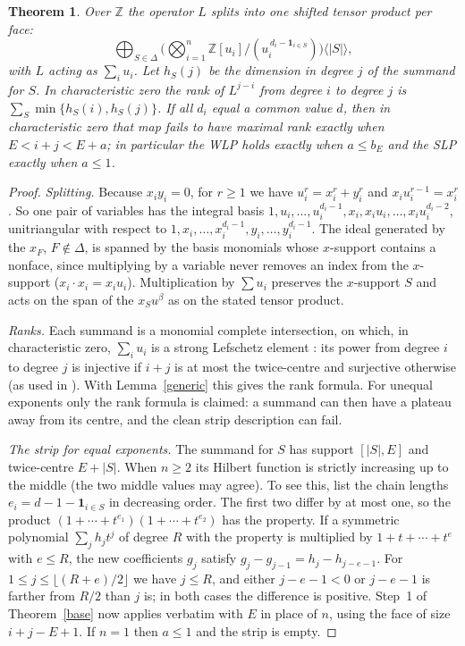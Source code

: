 \documentclass[11pt,a4paper]{article}
\newtheorem{theorem}{Theorem}[section]
\theoremstyle{definition}
\begin{document}
\begin{theorem}\label{higher}
Over $\mathbb Z$ the operator $L$ splits into one shifted tensor product per face:
\[
 \bigoplus_{S\in\Delta}\Big(\bigotimes_{i=1}^n\mathbb Z[u_i]/(u_i^{\,d_i-\mathbf1_{i\in S}})\Big)\langle|S|\rangle ,
\]
with $L$ acting as $\sum_iu_i$. Let $h_S(j)$ be the dimension in degree $j$ of the summand for $S$. In characteristic zero the rank of $L^{j-i}$ from degree $i$ to degree $j$ is $\sum_S\min\{h_S(i),h_S(j)\}$. If all $d_i$ equal a common value $d$, then in characteristic zero that map fails to have maximal rank exactly when $E<i+j<E+a$; in particular the WLP holds exactly when $a\le b_E$ and the SLP exactly when $a\le1$.
\end{theorem}
\begin{proof}
\emph{Splitting.} Because $x_iy_i=0$, for $r\ge1$ we have $u_i^r=x_i^r+y_i^r$ and $x_iu_i^{r-1}=x_i^r$. So one pair of variables has the integral basis $1,u_i,\dots,u_i^{d_i-1},x_i,x_iu_i,\dots,x_iu_i^{d_i-2}$, unitriangular with respect to $1,x_i,\dots,x_i^{d_i-1},y_i,\dots,y_i^{d_i-1}$. The ideal generated by the $x_F$, $F\notin\Delta$, is spanned by the basis monomials whose $x$-support contains a nonface, since multiplying by a variable never removes an index from the $x$-support ($x_i\cdot x_i=x_iu_i$). Multiplication by $\sum u_i$ preserves the $x$-support $S$ and acts on the span of the $x_Su^{\beta}$ as on the stated tensor product.

\emph{Ranks.} Each summand is a monomial complete intersection, on which, in characteristic zero, $\sum_iu_i$ is a strong Lefschetz element \cite{Stanley}: its power from degree $i$ to degree $j$ is injective if $i+j$ is at most the twice-centre and surjective otherwise (as used in \cite[Proposition~3.2]{HN}). With Lemma~\ref{generic} this gives the rank formula. For unequal exponents only the rank formula is claimed: a summand can then have a plateau away from its centre, and the clean strip description can fail.

\emph{The strip for equal exponents.} The summand for $S$ has support $[|S|,E]$ and twice-centre $E+|S|$. When $n\ge2$ its Hilbert function is strictly increasing up to the middle (the two middle values may agree). To see this, list the chain lengths $e_i=d-1-\mathbf1_{i\in S}$ in decreasing order. The first two differ by at most one, so the product $(1+\cdots+t^{e_1})(1+\cdots+t^{e_2})$ has the property. If a symmetric polynomial $\sum_jh_jt^j$ of degree $R$ with the property is multiplied by $1+t+\cdots+t^{e}$ with $e\le R$, the new coefficients $g_j$ satisfy $g_j-g_{j-1}=h_j-h_{j-e-1}$. For $1\le j\le\lfloor(R+e)/2\rfloor$ we have $j\le R$, and either $j-e-1<0$ or $j-e-1$ is farther from $R/2$ than $j$ is; in both cases the difference is positive. Step~1 of Theorem~\ref{base} now applies verbatim with $E$ in place of $n$, using the face of size $i+j-E+1$. If $n=1$ then $a\le1$ and the strip is empty.
\end{proof}
\end{document}
